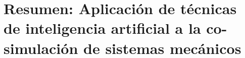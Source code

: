 

\section*{Resumen: Aplicación de técnicas de inteligencia artificial a la co-simulación de sistemas mecánicos}




